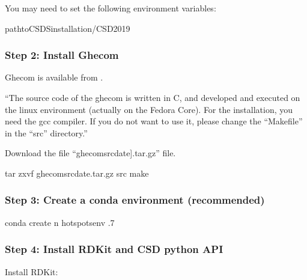 \documentclass[letterpaper,10pt,english]{sphinxmanual}
\begin{document}
You may need to set the following environment variables:

\begin{sphinxVerbatim}[commandchars=\\\{\}]
 \PYGZlt{}path\PYGZus{}to\PYGZus{}CSDS\PYGZus{}installation\PYGZgt{}/CSD\PYGZus{}2019
\end{sphinxVerbatim}


\subsubsection{Step 2: Install Ghecom}
\label{\detokenize{tutorial:step-2-install-ghecom}}
Ghecom is available from .

“The source code of the ghecom is written in C, and developed and executed on
the linux environment (actually on the Fedora Core).  For the installation,
you need the gcc compiler.  If you do not want to use it, please change the
“Makefile” in the “src” directory.”

Download the file “ghecom\sphinxhyphen{}src\sphinxhyphen{}{[}date{]}.tar.gz” file.

\begin{sphinxVerbatim}[commandchars=\\\{\}]
tar zxvf ghecom\PYGZhy{}src\PYGZhy{}\PYG{o}{[}date\PYG{o}{]}.tar.gz
 src
make
 
\end{sphinxVerbatim}


\subsubsection{Step 3: Create a conda environment (recommended)}
\label{\detokenize{tutorial:step-3-create-a-conda-environment-recommended}}
\begin{sphinxVerbatim}[commandchars=\\\{\}]
conda create \PYGZhy{}n hotspots\PYGZus{}env .7
\end{sphinxVerbatim}


\subsubsection{Step 4: Install RDKit and CSD python API}
\label{\detokenize{tutorial:step-4-install-rdkit-and-csd-python-api}}
Install RDKit:
\end{document}
